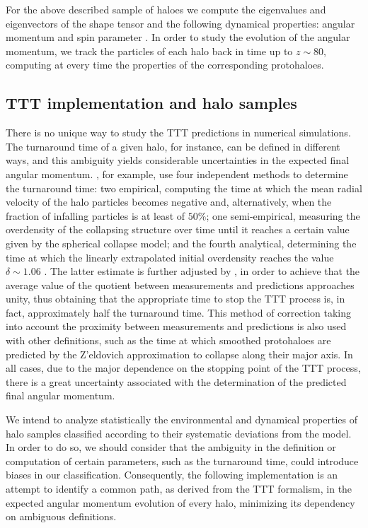 \documentclass[fleqn,usenatbib]{mnras}
\begin{document}
For the above described sample of haloes we compute the eigenvalues and eigenvectors of the shape tensor \citep{pazetal2006} and the following dynamical properties: angular momentum and spin parameter \citep{bullocketal2001}. In order to study the evolution of the angular momentum, we track the particles of each halo back in time up to $z \sim 80$, computing at every time the properties of the corresponding protohaloes.

\subsection{TTT implementation and halo samples}
\label{ttt_implementation}
There is no unique way to study the TTT predictions in numerical simulations. The turnaround time of a given halo, for instance, can be defined in different ways, and this ambiguity yields considerable uncertainties in the expected final angular momentum. \citet{sugermanetal2000}, for example, use four independent methods to determine the turnaround time: two empirical, computing the time at which the mean radial velocity of the halo particles becomes negative and, alternatively, when the fraction of infalling particles is at least of $50\%$; one semi-empirical, measuring the overdensity of the collapsing structure over time until it reaches a certain value given by the spherical collapse model; and the fourth analytical, determining the time at which the linearly extrapolated initial overdensity reaches the value $\delta\sim 1.06$ \citep{peebles1980}. The latter estimate is further adjusted by \citet{porcianietal2002a}, in order to achieve that the average value of the quotient between measurements and predictions approaches unity, thus obtaining that the appropriate time to stop the TTT process is, in fact, approximately half the turnaround time. This method of correction taking into account the proximity between measurements and predictions is also used with other definitions, such as the time at which smoothed protohaloes are predicted by the Z'eldovich approximation to collapse along their major axis. In all cases, due to the major dependence on the stopping point of the TTT process, there is a great uncertainty associated with the determination of the predicted final angular momentum.

We intend to analyze statistically the environmental and dynamical properties of halo samples classified according to their systematic deviations from the model. In order to do so, we should consider that the ambiguity in the definition or computation of certain parameters, such as the turnaround time, could introduce biases in our classification. Consequently, the following implementation is an attempt to identify a common path, as derived from the TTT formalism, in the expected angular momentum evolution of every halo, minimizing its dependency on ambiguous definitions.
\end{document}
